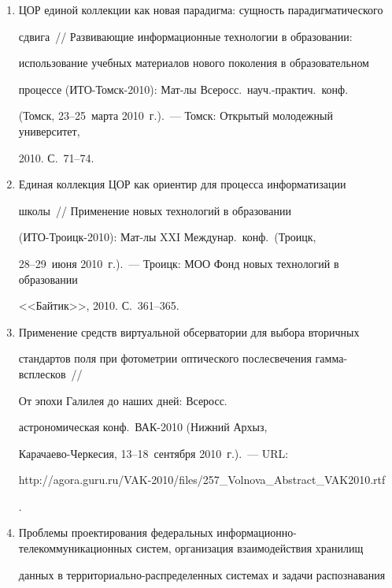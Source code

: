 \begin{enumerate}[1.]
\item {}


ЦОР единой коллекции как новая парадигма: сущность парадигматического 


сдвига~/\!\!/  Развивающие информационные технологии в образовании: 


использование учебных материалов нового поколения в образовательном 


процессе (ИТО-Томск-2010): Мат-лы Всеросс.\  науч.-практич.\ конф.\  


(Томск, 23--25~марта 2010~г.).~--- Томск: Открытый молодежный университет, 


2010. С.~71--74.


\item {}


Единая коллекция ЦОР как ориентир для процесса информатизации 


школы~/\!\!/  Применение новых технологий в образовании 


(ИТО-Троицк-2010): Мат-лы XXI Междунар.\ конф.\ (Троицк, 


28--29~июня 2010~г.).~--- Троицк: МОО Фонд новых технологий в образовании 


<<Байтик>>, 2010. С.~361--365.


\item {}


Применение средств виртуальной обсерватории для выбора вторичных 


стандартов поля при фотометрии оптического послесвечения гамма-всплес\-ков~/\!\!/  


От эпохи Галилея до наших дней: Всеросс.\


астрономическая конф.\ ВАК-2010 (Нижний Архыз, 


Карачаево-Черкесия, 13--18~сентября 2010~г.).~--- URL: {\sf 


http://agora.guru.ru/VAK-2010/files/257\_Volnova\_Abstract\_VAK2010.rtf}.


\item {}


Проблемы проектирования федеральных информационно-телекоммуникационных сис\-тем, организация взаимодействия хранилищ 


данных в территориально-распределенных сис\-темах и задачи распознавания 



\end{enumerate}
